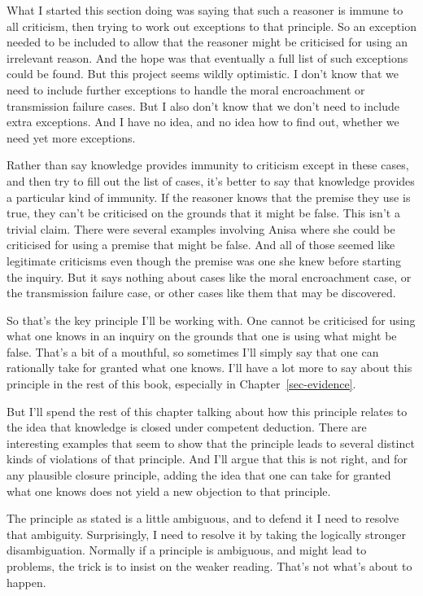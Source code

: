 \documentclass[
  12pt,
  letterpaper,
]{scrbook}
\begin{document}
What I started this section doing was saying that such a reasoner is
immune to all criticism, then trying to work out exceptions to that
principle. So an exception needed to be included to allow that the
reasoner might be criticised for using an irrelevant reason. And the
hope was that eventually a full list of such exceptions could be found.
But this project seems wildly optimistic. I don't know that we need to
include further exceptions to handle the moral encroachment or
transmission failure cases. But I also don't know that we don't need to
include extra exceptions. And I have no idea, and no idea how to find
out, whether we need yet more exceptions.

Rather than say knowledge provides immunity to criticism except in these
cases, and then try to fill out the list of cases, it's better to say
that knowledge provides a particular kind of immunity. If the reasoner
knows that the premise they use is true, they can't be criticised on the
grounds that it might be false. This isn't a trivial claim. There were
several examples involving Anisa where she could be criticised for using
a premise that might be false. And all of those seemed like legitimate
criticisms even though the premise was one she knew before starting the
inquiry. But it says nothing about cases like the moral encroachment
case, or the transmission failure case, or other cases like them that
may be discovered.

So that's the key principle I'll be working with. One cannot be
criticised for using what one knows in an inquiry on the grounds that
one is using what might be false. That's a bit of a mouthful, so
sometimes I'll simply say that one can rationally take for granted what
one knows. I'll have a lot more to say about this principle in the rest
of this book, especially in Chapter~\ref{sec-evidence}.

But I'll spend the rest of this chapter talking about how this principle
relates to the idea that knowledge is closed under competent deduction.
There are interesting examples that seem to show that the principle
leads to several distinct kinds of violations of that principle. And
I'll argue that this is not right, and for any plausible closure
principle, adding the idea that one can take for granted what one knows
does not yield a new objection to that principle.

The principle as stated is a little ambiguous, and to defend it I need
to resolve that ambiguity. Surprisingly, I need to resolve it by taking
the logically stronger disambiguation. Normally if a principle is
ambiguous, and might lead to problems, the trick is to insist on the
weaker reading. That's not what's about to happen.
\end{document}
